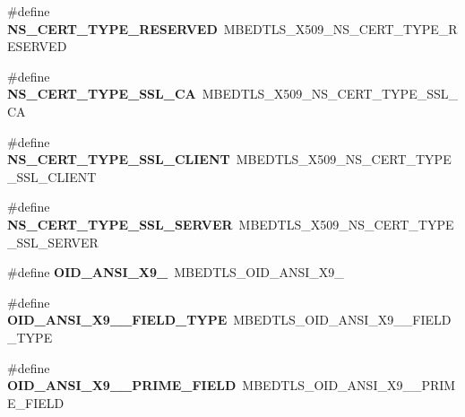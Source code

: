 \begin{DoxyCompactItemize}
\item 
\mbox{\label{compat-1_83_8h_a387e2b15df37666dfd95646bf647dae1}} 
\#define {\bfseries N\+S\+\_\+\+C\+E\+R\+T\+\_\+\+T\+Y\+P\+E\+\_\+\+R\+E\+S\+E\+R\+V\+ED}~M\+B\+E\+D\+T\+L\+S\+\_\+\+X509\+\_\+\+N\+S\+\_\+\+C\+E\+R\+T\+\_\+\+T\+Y\+P\+E\+\_\+\+R\+E\+S\+E\+R\+V\+ED
\item 
\mbox{\label{compat-1_83_8h_a9f5cdaf33a0371bdd6893f7c36acf8ef}} 
\#define {\bfseries N\+S\+\_\+\+C\+E\+R\+T\+\_\+\+T\+Y\+P\+E\+\_\+\+S\+S\+L\+\_\+\+CA}~M\+B\+E\+D\+T\+L\+S\+\_\+\+X509\+\_\+\+N\+S\+\_\+\+C\+E\+R\+T\+\_\+\+T\+Y\+P\+E\+\_\+\+S\+S\+L\+\_\+\+CA
\item 
\mbox{\label{compat-1_83_8h_a1720f538cb0b7efa97d134ac6692192a}} 
\#define {\bfseries N\+S\+\_\+\+C\+E\+R\+T\+\_\+\+T\+Y\+P\+E\+\_\+\+S\+S\+L\+\_\+\+C\+L\+I\+E\+NT}~M\+B\+E\+D\+T\+L\+S\+\_\+\+X509\+\_\+\+N\+S\+\_\+\+C\+E\+R\+T\+\_\+\+T\+Y\+P\+E\+\_\+\+S\+S\+L\+\_\+\+C\+L\+I\+E\+NT
\item 
\mbox{\label{compat-1_83_8h_a725ac67650ba113b8a8938e1f9cdb073}} 
\#define {\bfseries N\+S\+\_\+\+C\+E\+R\+T\+\_\+\+T\+Y\+P\+E\+\_\+\+S\+S\+L\+\_\+\+S\+E\+R\+V\+ER}~M\+B\+E\+D\+T\+L\+S\+\_\+\+X509\+\_\+\+N\+S\+\_\+\+C\+E\+R\+T\+\_\+\+T\+Y\+P\+E\+\_\+\+S\+S\+L\+\_\+\+S\+E\+R\+V\+ER
\item 
\mbox{\label{compat-1_83_8h_a80de5d243898b4fafc9287ed8aab5ec8}} 
\#define {\bfseries O\+I\+D\+\_\+\+A\+N\+S\+I\+\_\+\+X9\+\_}~M\+B\+E\+D\+T\+L\+S\+\_\+\+O\+I\+D\+\_\+\+A\+N\+S\+I\+\_\+\+X9\+\_
\item 
\mbox{\label{compat-1_83_8h_a7fb8de1fb7902758a1d2158cddfedd5a}} 
\#define {\bfseries O\+I\+D\+\_\+\+A\+N\+S\+I\+\_\+\+X9\+\_\+\_\+\+F\+I\+E\+L\+D\+\_\+\+T\+Y\+PE}~M\+B\+E\+D\+T\+L\+S\+\_\+\+O\+I\+D\+\_\+\+A\+N\+S\+I\+\_\+\+X9\+\_\+\_\+\+F\+I\+E\+L\+D\+\_\+\+T\+Y\+PE
\item 
\mbox{\label{compat-1_83_8h_a94f681f061148e5ef616a7ea25700c50}} 
\#define {\bfseries O\+I\+D\+\_\+\+A\+N\+S\+I\+\_\+\+X9\+\_\+\_\+\+P\+R\+I\+M\+E\+\_\+\+F\+I\+E\+LD}~M\+B\+E\+D\+T\+L\+S\+\_\+\+O\+I\+D\+\_\+\+A\+N\+S\+I\+\_\+\+X9\+\_\+\_\+\+P\+R\+I\+M\+E\+\_\+\+F\+I\+E\+LD

\end{DoxyCompactItemize}
